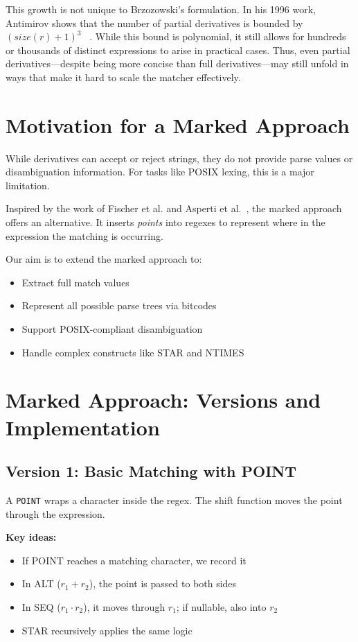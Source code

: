 \documentclass[11pt]{article}
\begin{document}
This growth is not unique to Brzozowski’s formulation. In his 1996 work, Antimirov shows that the number of partial derivatives is bounded by ${( {size}(r) + 1)^3}$ ~\cite{Antimirov1996}. While this bound is polynomial, it still allows for hundreds or thousands of distinct expressions to arise in practical cases. Thus, even partial derivatives—despite being more concise than full derivatives—may still unfold in ways that make it hard to scale the matcher effectively.


\section{Motivation for a Marked Approach}
While derivatives can accept or reject strings, they do not provide parse values or disambiguation information. For tasks like POSIX lexing, this is a major limitation.

Inspired by the work of Fischer et al. and Asperti et al.~\cite{Fischer2010, Asperti2010}, the marked approach offers an alternative. It inserts \emph{points} into regexes to represent where in the expression the matching is occurring.

Our aim is to extend the marked approach to:
\begin{itemize}
\item Extract full match values
\item Represent all possible parse trees via bitcodes
\item Support POSIX-compliant disambiguation
\item Handle complex constructs like STAR and NTIMES
\end{itemize}

\section{Marked Approach: Versions and Implementation}

\subsection*{Version 1: Basic Matching with POINT}
A \texttt{POINT} wraps a character inside the regex. The shift function moves the point through the expression.

\textbf{Key ideas:}
\begin{itemize}
\item If POINT reaches a matching character, we record it
\item In ALT ($r_1 + r_2$), the point is passed to both sides
\item In SEQ ($r_1 \cdot r_2$), it moves through $r_1$; if nullable, also into $r_2$
\item STAR recursively applies the same logic
\end{itemize}
\end{document}
